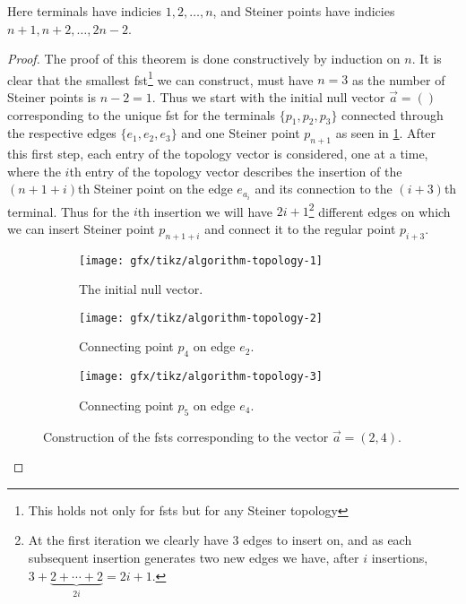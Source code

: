 Here terminals have indicies $1, 2, \ldots, n$, and Steiner points have indicies
$n + 1, n + 2, \ldots, 2 n - 2$.

\begin{proof}
The proof of this theorem is done constructively by induction on $n$. It is
clear that the smallest \ac{fst}\footnote{This holds not only for \acp{fst}
  but for any Steiner topology} we can construct, must have $n = 3$ as the
number of Steiner points is $n - 2 = 1$. Thus we start with the initial null
vector $\vec{a} = ()$ corresponding to the unique \ac{fst} for the terminals
$\{p_1, p_2, p_3\}$ connected through the respective edges $\{e_1, e_2, e_3\}$ and one
Steiner point $p_{n+1}$ as seen in \cref{fig:algorithm-topology-1}. After this
first step, each entry of the topology vector is considered, one at a time,
where the $i$th entry of the topology vector describes the insertion of the
$(n+1+i)$th Steiner point on the edge $e_{a_{i}}$ and its connection to the
$(i+3)$th terminal. Thus for the $i$th insertion we will have
$2i+1$\footnote{At the first iteration we clearly have $3$ edges to insert on, and
  as each subsequent insertion generates two new edges we have, after $i$
  insertions, $3 + \underbrace{2 + \cdots + 2}_{2 i} = 2 i + 1$.} different
edges on which we can insert Steiner point $p_{n + 1 + i}$ and connect it to the
regular point $p_{i+3}$.
%
\begin{figure}[htbp] \centering
  \begin{subfigure}[t]{0.267\textwidth}
    \texttt{[image: gfx/tikz/algorithm-topology-1]}
    \caption{The initial null vector.\label{fig:algorithm-topology-1}}
  \end{subfigure}\hspace{1em}%
  \begin{subfigure}[t]{0.267\textwidth}
    \texttt{[image: gfx/tikz/algorithm-topology-2]}
    \caption{Connecting point $p_4$ on edge $e_2$.\label{fig:algorithm-topology-2}}
  \end{subfigure}\hspace{1em}%
  \begin{subfigure}[t]{0.267\textwidth}
    \texttt{[image: gfx/tikz/algorithm-topology-3]}
    \caption{Connecting point $p_5$ on edge $e_4$.\label{fig:algorithm-topology-3}}
  \end{subfigure}
  \caption[Construction of FSTs]{Construction of the \acsp{fst} corresponding
to the vector $\vec{a} = (2, 4)$.\label{fig:algorithm-topologies}}
\end{figure}
\end{proof}

